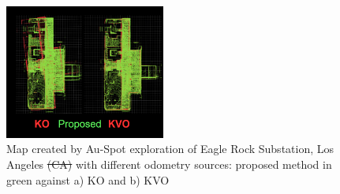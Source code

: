 \documentclass[letterpaper, 10pt, conference]{ieeeconf}      %
\newcommand{\inst}[1]{{\color{orange} #1 }} %
\newcommand{\rev}[1]{{\color{blue} #1 }} %
\begin{document}







\begin{figure}[t!]
  \centering
  \includegraphics[width=0.47\textwidth]{graphics/spot_proposed_eagle_rock.PNG}
  \caption{Map created by Au-Spot exploration of Eagle Rock Substation, Los Angeles \rev{\st{(CA)}} with different odometry sources: proposed method in green against a) KO and b) KVO}
  \label{spot_eagle_rock}
\end{figure}
\end{document}
